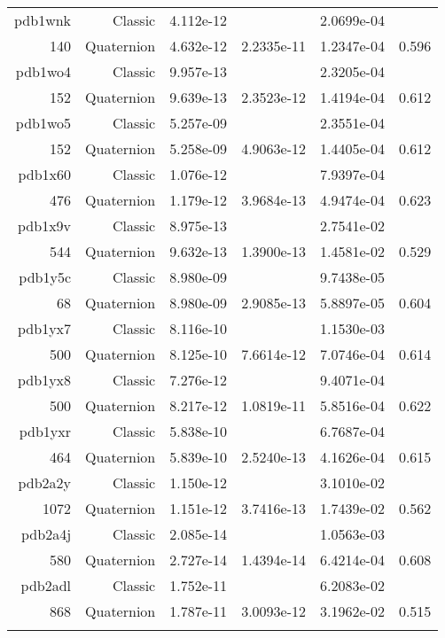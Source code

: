 \begin{xltabular}{\textwidth}{r|rS[table-format=1.3e+2]S[table-format=1.4e+2]S[table-format=1.4e+2]S[table-format=-1.3]}
pdb1wnk & Classic & 4.112e-12 &  & 2.0699e-04 & \\
140 & Quaternion & 4.632e-12 & 2.2335e-11 & 1.2347e-04 & 0.596\\  \addlinespace
pdb1wo4 & Classic & 9.957e-13 &  & 2.3205e-04 & \\
152 & Quaternion & 9.639e-13 & 2.3523e-12 & 1.4194e-04 & 0.612\\  \addlinespace
pdb1wo5 & Classic & 5.257e-09 &  & 2.3551e-04 & \\
152 & Quaternion & 5.258e-09 & 4.9063e-12 & 1.4405e-04 & 0.612\\  \addlinespace
pdb1x60 & Classic & 1.076e-12 &  & 7.9397e-04 & \\
476 & Quaternion & 1.179e-12 & 3.9684e-13 & 4.9474e-04 & 0.623\\  \addlinespace
{\color{red} pdb1x9v } & Classic & 8.975e-13 &  & 2.7541e-02 & \\
544 & Quaternion & 9.632e-13 & 1.3900e-13 & 1.4581e-02 & 0.529\\  \addlinespace
pdb1y5c & Classic & 8.980e-09 &  & 9.7438e-05 & \\
68 & Quaternion & 8.980e-09 & 2.9085e-13 & 5.8897e-05 & 0.604\\  \addlinespace
pdb1yx7 & Classic & 8.116e-10 &  & 1.1530e-03 & \\
500 & Quaternion & 8.125e-10 & 7.6614e-12 & 7.0746e-04 & 0.614\\  \addlinespace
pdb1yx8 & Classic & 7.276e-12 &  & 9.4071e-04 & \\
500 & Quaternion & 8.217e-12 & 1.0819e-11 & 5.8516e-04 & 0.622\\  \addlinespace
pdb1yxr & Classic & 5.838e-10 &  & 6.7687e-04 & \\
464 & Quaternion & 5.839e-10 & 2.5240e-13 & 4.1626e-04 & 0.615\\  \addlinespace
{\color{red} pdb2a2y } & Classic & 1.150e-12 &  & 3.1010e-02 & \\
1072 & Quaternion & 1.151e-12 & 3.7416e-13 & 1.7439e-02 & 0.562\\  \addlinespace
pdb2a4j & Classic & 2.085e-14 &  & 1.0563e-03 & \\
580 & Quaternion & 2.727e-14 & 1.4394e-14 & 6.4214e-04 & 0.608\\  \addlinespace
{\color{red} pdb2adl } & Classic & 1.752e-11 &  & 6.2083e-02 & \\
868 & Quaternion & 1.787e-11 & 3.0093e-12 & 3.1962e-02 & 0.515\\  \addlinespace

\end{xltabular}
